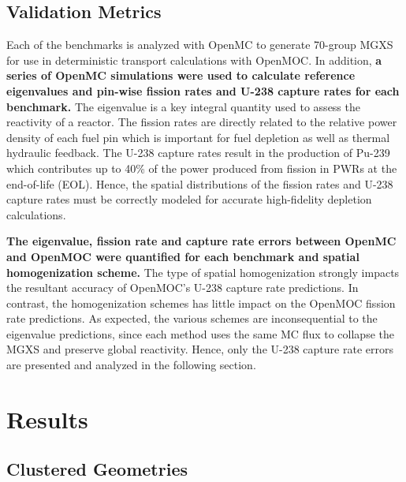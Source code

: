 \documentclass[12pt,twoside]{mitthesis-exec}
\begin{document}
\subsection*{Validation Metrics}

Each of the benchmarks is analyzed with OpenMC to generate 70-group MGXS for use in deterministic transport calculations with OpenMOC. In addition, \textbf{a series of OpenMC simulations were used to calculate reference eigenvalues and pin-wise fission rates and U-238 capture rates for each benchmark.} The eigenvalue is a key integral quantity used to assess the reactivity of a reactor. The fission rates are directly related to the relative power density of each fuel pin which is important for fuel depletion as well as thermal hydraulic feedback. The U-238 capture rates result in the production of Pu-239 which contributes up to 40\% of the power produced from fission in PWRs at the end-of-life (EOL). Hence, the spatial distributions of the fission rates and U-238 capture rates must be correctly modeled for accurate high-fidelity depletion calculations. 

\textbf{The eigenvalue, fission rate and capture rate errors between OpenMC and OpenMOC were quantified for each benchmark and spatial homogenization scheme.} The type of spatial homogenization strongly impacts the resultant accuracy of OpenMOC's U-238 capture rate predictions. In contrast, the homogenization schemes has little impact on the OpenMOC fission rate predictions. As expected, the various schemes are inconsequential to the eigenvalue predictions, since each method uses the same MC flux to collapse the MGXS and preserve global reactivity. Hence, only the U-238 capture rate errors are presented and analyzed in the following section.


\section*{Results}

\subsection*{Clustered Geometries}
\end{document}
